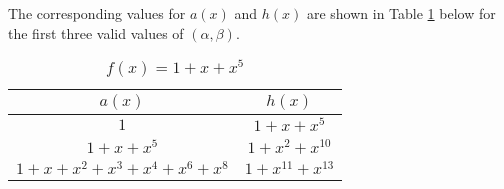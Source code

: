 \begin{example}
The corresponding values for $a(x)$ and $h(x)$ are shown in Table \ref{novelTab8-b} below for the first three valid values of $(\alpha,\beta)$.
\begin{table}[htbp]
 \caption{$f(x)=1+x+x^5$}
\centering
 \begin{tabular}{c c} 
 \hline
 $a(x)$ & $h(x)$\\ [0.5ex] 
 \hline\hline
$1$ & $1+x+x^{5}$\\ 
\hline
$1+x+x^5$ &  $1+x^2+x^{10}$\\
\hline
$1+x+x^2+x^3+x^4+x^{6}+x^{8}$ & $1+x^{11}+x^{13}$\\
 \end{tabular}
 \label{novelTab8-b}
\end{table}

\label{ex-5}
\end{example}
 







